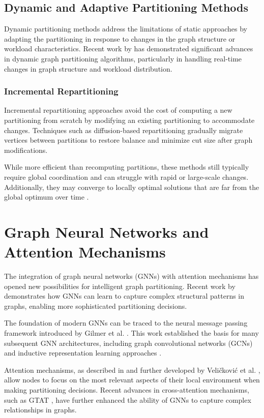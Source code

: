\subsection{Dynamic and Adaptive Partitioning Methods}
Dynamic partitioning methods address the limitations of static approaches by adapting the partitioning in response to changes in the graph structure or workload characteristics. Recent work by \cite{partitioning2023} has demonstrated significant advances in dynamic graph partitioning algorithms, particularly in handling real-time changes in graph structure and workload distribution.

\subsubsection{Incremental Repartitioning}
Incremental repartitioning approaches avoid the cost of computing a new partitioning from scratch by modifying an existing partitioning to accommodate changes. Techniques such as diffusion-based repartitioning \cite{schloegel2000graph} gradually migrate vertices between partitions to restore balance and minimize cut size after graph modifications.

While more efficient than recomputing partitions, these methods still typically require global coordination and can struggle with rapid or large-scale changes. Additionally, they may converge to locally optimal solutions that are far from the global optimum over time \cite{conference2023}.

\section{Graph Neural Networks and Attention Mechanisms}
The integration of graph neural networks (GNNs) with attention mechanisms has opened new possibilities for intelligent graph partitioning. Recent work by \cite{gnn2023} demonstrates how GNNs can learn to capture complex structural patterns in graphs, enabling more sophisticated partitioning decisions.

The foundation of modern GNNs can be traced to the neural message passing framework introduced by Gilmer et al. \cite{gilmer2017neural}. This work established the basis for many subsequent GNN architectures, including graph convolutional networks (GCNs) \cite{kipf2017semi} and inductive representation learning approaches \cite{hamilton2017inductive}.

Attention mechanisms, as described in \cite{attention2023} and further developed by Veličković et al. \cite{velivckovic2018graph}, allow nodes to focus on the most relevant aspects of their local environment when making partitioning decisions. Recent advances in cross-attention mechanisms, such as GTAT \cite{shen2025gtat}, have further enhanced the ability of GNNs to capture complex relationships in graphs.

